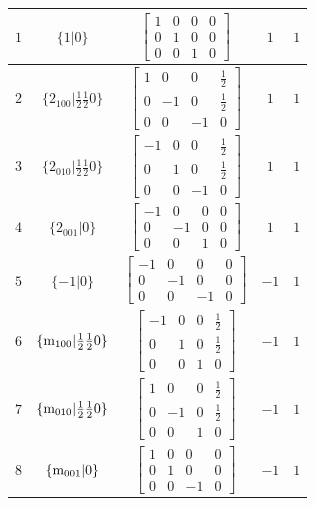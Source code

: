 \documentclass[fleqn,8pt]{jsarticle}
\begin{document}
\begin{longtable}{ccccc}
$ 1 $ & $ \{1|0\} $ & $ \begin{bmatrix} 1 & 0 & 0 & 0 \\ 0 & 1 & 0 & 0 \\ 0 & 0 & 1 & 0 \end{bmatrix} $ & $ 1 $ & $ 1 $ \\ \hline
$ 2 $ & $ \{2{}_{100}|\frac{1}{2} \frac{1}{2} 0\} $ & $ \begin{bmatrix} 1 & 0 & 0 & \frac{1}{2} \\ 0 & -1 & 0 & \frac{1}{2} \\ 0 & 0 & -1 & 0 \end{bmatrix} $ & $ 1 $ & $ 1 $ \\ \hline
$ 3 $ & $ \{2{}_{010}|\frac{1}{2} \frac{1}{2} 0\} $ & $ \begin{bmatrix} -1 & 0 & 0 & \frac{1}{2} \\ 0 & 1 & 0 & \frac{1}{2} \\ 0 & 0 & -1 & 0 \end{bmatrix} $ & $ 1 $ & $ 1 $ \\ \hline
$ 4 $ & $ \{2{}_{001}|0\} $ & $ \begin{bmatrix} -1 & 0 & 0 & 0 \\ 0 & -1 & 0 & 0 \\ 0 & 0 & 1 & 0 \end{bmatrix} $ & $ 1 $ & $ 1 $ \\ \hline
$ 5 $ & $ \{-1|0\} $ & $ \begin{bmatrix} -1 & 0 & 0 & 0 \\ 0 & -1 & 0 & 0 \\ 0 & 0 & -1 & 0 \end{bmatrix} $ & $ -1 $ & $ 1 $ \\ \hline
$ 6 $ & $ \{{\rm m}_{100}|\frac{1}{2} \frac{1}{2} 0\} $ & $ \begin{bmatrix} -1 & 0 & 0 & \frac{1}{2} \\ 0 & 1 & 0 & \frac{1}{2} \\ 0 & 0 & 1 & 0 \end{bmatrix} $ & $ -1 $ & $ 1 $ \\ \hline
$ 7 $ & $ \{{\rm m}_{010}|\frac{1}{2} \frac{1}{2} 0\} $ & $ \begin{bmatrix} 1 & 0 & 0 & \frac{1}{2} \\ 0 & -1 & 0 & \frac{1}{2} \\ 0 & 0 & 1 & 0 \end{bmatrix} $ & $ -1 $ & $ 1 $ \\ \hline
$ 8 $ & $ \{{\rm m}_{001}|0\} $ & $ \begin{bmatrix} 1 & 0 & 0 & 0 \\ 0 & 1 & 0 & 0 \\ 0 & 0 & -1 & 0 \end{bmatrix} $ & $ -1 $ & $ 1 $ \\ \hline

\end{longtable}
\end{document}
